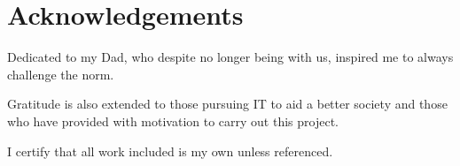 \chapter*{Acknowledgements}

Dedicated to my Dad, who despite no longer being with us, inspired me to always challenge the norm.

Gratitude is also extended to those pursuing IT to aid a better society and those who have provided with motivation to carry out this project.

I certify that all work included is my own unless referenced.